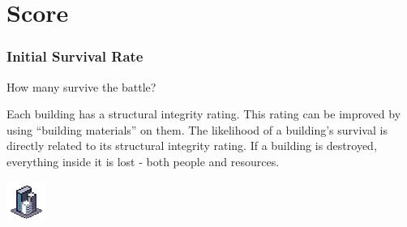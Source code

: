 \documentclass[ascpectratio=169]{beamer}
\begin{document}


\section{Score}


\begin{frame}

  \frametitle{Initial Survival Rate}

  \begin{center}
    {\large How many survive the battle?}
  \end{center}

  \begin{outline}
    \1 Each building has a structural integrity rating.
    \1 This rating can be improved by using ``building materials'' on them.
    \1 The likelihood of a building's survival is directly related to its
    structural integrity rating.
    \1 If a building is destroyed, everything inside it is lost - both people and
    resources.
  \end{outline}
  
  \begin{center}
    \includegraphics[scale=2.0]{../../Images/Apartments.png}
  \end{center}

\end{frame}


\end{document}
